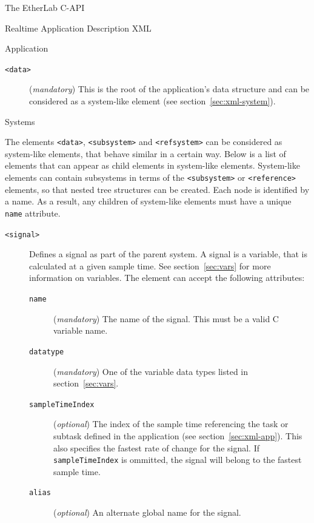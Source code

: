 \begin{ighsec}{The EtherLab C-API}
\begin{ighsec}{Realtime Application Description XML}
\begin{ighsec}{Application}
\begin{description}
\item[\small\texttt{<data>}] (\textit{mandatory}) This is the root of the
application's data structure and can be considered as a system-like element
(see section~\ref{sec:xml-system}).

\end{description}

\end{ighsec}

\begin{ighsec}{Systems}
\label{sec:xml-system}

The elements \texttt{<data>}, \texttt{<subsystem>} and \texttt{<refsystem>}
can be considered as system-like elements, that behave similar in a certain
way.  Below is a list of elements that can appear as child elements in
system-like elements. System-like elements can contain subsystems in terms of
the \texttt{<subsystem>} or \texttt{<reference>} elements, so that nested tree
structures can be created. Each node is identified by a name. As a result, any
children of system-like elements must have a unique \texttt{name} attribute.

\begin{description}

\item[\small\texttt{<signal>}] Defines a signal as part of the parent system.
A signal is a variable, that is calculated at a given sample time. See
section~\ref{sec:vars} for more information on variables. The element can
accept the following attributes:

\begin{description}

\item[\small\texttt{name}] (\textit{mandatory}) The name of the signal. This
must be a valid C variable name.

\item[\small\texttt{datatype}] (\textit{mandatory}) One of the variable data
types listed in section~\ref{sec:vars}.

\item[\small\texttt{sampleTimeIndex}] (\textit{optional}) The index of the
sample time referencing the task or subtask defined in the application (see
section~\ref{sec:xml-app}). This also specifies the fastest rate of change for
the signal. If \texttt{sampleTimeIndex} is ommitted, the signal will belong to
the fastest sample time.

\item[\small\texttt{alias}] (\textit{optional}) An alternate global name for
the signal.


\end{description}
\end{description}
\end{ighsec}
\end{ighsec}
\end{ighsec}
